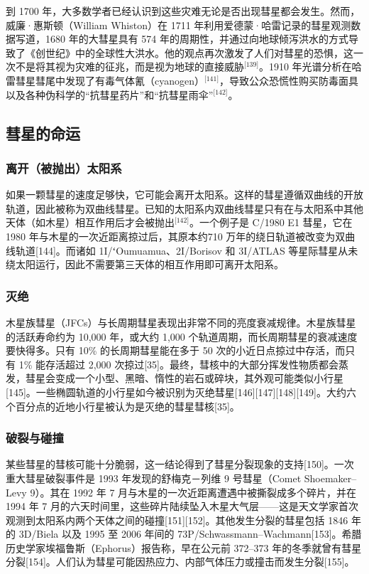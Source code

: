 到 1700 年，大多数学者已经认识到这些灾难无论是否出现彗星都会发生。然而，威廉·惠斯顿（William Whiston）在 1711 年利用爱德蒙·哈雷记录的彗星观测数据写道，1680 年的大彗星具有 574 年的周期性，并通过向地球倾泻洪水的方式导致了《创世纪》中的全球性大洪水。他的观点再次激发了人们对彗星的恐惧，这一次不是将其视为灾难的征兆，而是视为地球的直接威胁\(^\text{[139]}\)。1910 年光谱分析在哈雷彗星彗尾中发现了有毒气体氰（cyanogen）\(^\text{[141]}\)，导致公众恐慌性购买防毒面具以及各种伪科学的“抗彗星药片”和“抗彗星雨伞”\(^\text{[142]}\)。
\subsection{彗星的命运}
\subsubsection{离开（被抛出）太阳系}
如果一颗彗星的速度足够快，它可能会离开太阳系。这样的彗星遵循双曲线的开放轨道，因此被称为双曲线彗星。已知的太阳系内双曲线彗星只有在与太阳系中其他天体（如木星）相互作用后才会被抛出\(^\text{[142]}\)。一个例子是 C/1980 E1 彗星，它在 1980 年与木星的一次近距离掠过后，其原本约710 万年的绕日轨道被改变为双曲线轨道[144]。而诸如 1I/ʻOumuamua、2I/Borisov 和 3I/ATLAS 等星际彗星从未绕太阳运行，因此不需要第三天体的相互作用即可离开太阳系。
\subsubsection{灭绝}
木星族彗星（JFCs）与长周期彗星表现出非常不同的亮度衰减规律。木星族彗星的活跃寿命约为 10,000 年，或大约 1,000 个轨道周期，而长周期彗星的衰减速度要快得多。只有 10\% 的长周期彗星能在多于 50 次的小近日点掠过中存活，而只有 1\% 能存活超过 2,000 次掠过[35]。最终，彗核中的大部分挥发性物质都会蒸发，彗星会变成一个小型、黑暗、惰性的岩石或碎块，其外观可能类似小行星[145]。一些椭圆轨道的小行星如今被识别为灭绝彗星[146][147][148][149]。大约六个百分点的近地小行星被认为是灭绝的彗星彗核[35]。
\subsubsection{破裂与碰撞}
某些彗星的彗核可能十分脆弱，这一结论得到了彗星分裂现象的支持[150]。一次重大彗星破裂事件是 1993 年发现的舒梅克－列维 9 号彗星（Comet Shoemaker–Levy 9）。其在 1992 年 7 月与木星的一次近距离遭遇中被撕裂成多个碎片，并在 1994 年 7 月的六天时间里，这些碎片陆续坠入木星大气层——这是天文学家首次观测到太阳系内两个天体之间的碰撞[151][152]。其他发生分裂的彗星包括 1846 年的 3D/Biela 以及 1995 至 2006 年间的 73P/Schwassmann–Wachmann[153]。希腊历史学家埃福鲁斯（Ephorus）报告称，早在公元前 372–373 年的冬季就曾有彗星分裂[154]。人们认为彗星可能因热应力、内部气体压力或撞击而发生分裂[155]。


